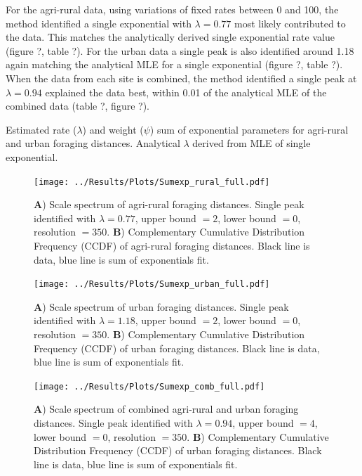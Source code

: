 \documentclass[11pt,usenames,dvipsnames]{article}
\begin{document}
For the agri-rural data, using variations of fixed rates between 0 and 100, the method identified a single exponential with $\lambda = 0.77$ most likely contributed to the data. This matches the analytically derived single exponential rate value (figure ?, table ?). For the urban data a single peak is also identified around 1.18 again matching the analytical MLE for a single exponential (figure ?, table ?). When the data from each site is combined, the method identified a single peak at $\lambda = 0.94$ explained the data best, within 0.01 of the analytical MLE of the combined data (table ?, figure ?). 

\begin{table}[H]
	\centering
	\caption{Estimated rate ($\lambda$) and weight ($\psi$) sum of exponential parameters for agri-rural and urban foraging distances. Analytical $\lambda$ derived from MLE of single exponential.}
	
\end{table}


\begin{figure}[H]
	\centering
	\texttt{[image: ../Results/Plots/Sumexp\_rural\_full.pdf]}
	\caption{\textbf{A}) Scale spectrum of agri-rural foraging distances. Single peak identified with $\lambda = 0.77$, upper bound $= 2$, lower bound $= 0$, resolution $= 350$. \textbf{B}) Complementary Cumulative Distribution Frequency (CCDF) of agri-rural foraging distances. Black line is data, blue line is sum of exponentials fit.}
\end{figure}

\begin{figure}[H]
	\centering
	\texttt{[image: ../Results/Plots/Sumexp\_urban\_full.pdf]}
	\caption{\textbf{A}) Scale spectrum of urban foraging distances. Single peak identified with $\lambda = 1.18$, upper bound $= 2$, lower bound $= 0$, resolution $= 350$. \textbf{B}) Complementary Cumulative Distribution Frequency (CCDF) of urban foraging distances. Black line is data, blue line is sum of exponentials fit.}
\end{figure}

\begin{figure}[H]
	\centering
	\texttt{[image: ../Results/Plots/Sumexp\_comb\_full.pdf]}
	\caption{\textbf{A}) Scale spectrum of combined agri-rural and urban foraging distances. Single peak identified with $\lambda = 0.94$, upper bound $= 4$, lower bound $= 0$, resolution $= 350$. \textbf{B}) Complementary Cumulative Distribution Frequency (CCDF) of urban foraging distances. Black line is data, blue line is sum of exponentials fit.}
\end{figure}
\end{document}
